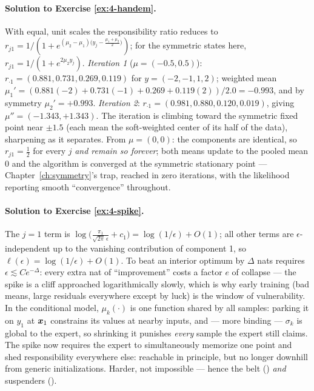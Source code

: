 \paragraph{Solution to Exercise \ref{ex:4-handem}.}
With equal, unit scales the responsibility ratio reduces to
$r_{j1} = 1/(1 + e^{(\mu_2 - \mu_1)\bigl(y_j - \frac{\mu_1 +
\mu_2}{2}\bigr)})$; for the symmetric states here, $r_{j1} = 1/(1 +
e^{2\mu_2 y_j})$. \emph{Iteration 1} ($\mu = (-0.5, 0.5)$):
$r_{\cdot 1} = (0.881, 0.731, 0.269, 0.119)$ for $y = (-2,-1,1,2)$;
weighted mean $\mu_1' = (0.881(-2) + 0.731(-1) + 0.269 + 0.119(2)) / 2.0
= -0.993$, and by symmetry $\mu_2' = +0.993$. \emph{Iteration 2}:
$r_{\cdot 1} = (0.981, 0.880, 0.120, 0.019)$, giving $\mu'' = (-1.343,
+1.343)$. The iteration is climbing toward the symmetric fixed point near
$\pm 1.5$ (each mean the soft-weighted center of its half of the data),
sharpening as it separates. From $\mu = (0, 0)$: the components are
identical, so $r_{j1} = \tfrac12$ for every $j$ \emph{and remain so
forever}; both means update to the pooled mean $0$ and the algorithm is
converged at the symmetric stationary point --- Chapter~\ref{ch:symmetry}'s
trap, reached in zero iterations, with the likelihood reporting smooth
``convergence'' throughout.

\paragraph{Solution to Exercise \ref{ex:4-spike}.}
The $j = 1$ term is $\log\bigl(\tfrac{\pi_1}{\sqrt{2\pi}\,\epsilon} +
c_1\bigr) = \log(1/\epsilon) + O(1)$; all other terms are
$\epsilon$-independent up to the vanishing contribution of component 1,
so $\ell(\epsilon) = \log(1/\epsilon) + O(1)$. To beat an interior
optimum by $\Delta$ nats requires $\epsilon \lesssim C e^{-\Delta}$:
every extra nat of ``improvement'' costs a factor $e$ of collapse ---
the spike is a cliff approached logarithmically slowly, which is why
early training (bad means, large residuals everywhere except by luck) is
the window of vulnerability. In the conditional model, $\mu_k(\cdot)$ is
one function shared by all samples: parking it on $y_1$ at $\bm{x}_1$
constrains its values at nearby inputs, and --- more binding ---
$\sigma_k$ is global to the expert, so shrinking it punishes
\emph{every} sample the expert still claims. The spike now requires the
expert to simultaneously memorize one point and shed responsibility
everywhere else: reachable in principle, but no longer downhill from
generic initializations. Harder, not impossible --- hence the belt
() \emph{and} suspenders ().

